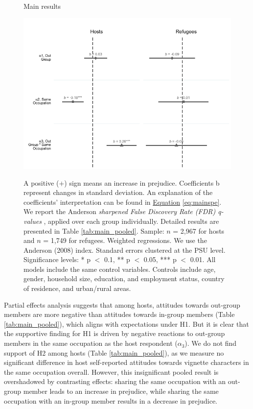 \documentclass[a4paper,12pt]{article}
\renewcommand{\footnotesize}{\fontsize{8pt}{9pt}\selectfont}
\begin{document}
    \begin{figure}[h]
        \footnotesize
        \captionsetup{width=0.7\linewidth}
        \caption{Main results}
        \label{fig:mainpooled}
         \centering
        \includegraphics[height=0.4\textwidth]{Figures/FIG4_CFP_Analysis.pdf} \\
        \caption*{
        \footnotesize A positive ($+$) sign means an increase in prejudice. Coefficients b represent changes in standard deviation. An explanation of the coefficients' interpretation can be found in \hyperref[eq:mainspe]{Equation} \ref{eq:mainspe}. We report the Anderson \textit{sharpened False Discovery Rate (FDR) q-values} \cite{anderson2008multiple}, applied over each group individually. Detailed results are presented in Table \ref{tab:main_pooled}. Sample: $n$ = 2,967 for hosts and $n$ = 1,749 for refugees. Weighted regressions. We use the Anderson (2008) index. Standard errors clustered at the PSU level. Significance levels: * p $<$ 0.1, ** p $<$ 0.05, *** p $<$ 0.01. All models include the same control variables. Controls include age, gender, household size, education, and employment status, country of residence, and urban/rural areas.}
        
    \vspace{5mm}
    \end{figure} 

    Partial effects analysis suggests that among hosts, attitudes towards out-group members are more negative than attitudes towards in-group members (Table \ref{tab:main_pooled}), which aligns with expectations under H1. But it is clear that the supportive finding for H1 is driven by negative reactions to out-group members in the same occupation as the host respondent ($\alpha_{3}$). We do not find support of H2 among hosts (Table \ref{tab:main_pooled}), as we measure no significant difference in host self-reported attitudes towards vignette characters in the same occupation overall. However, this insignificant pooled result is overshadowed by contrasting effects: sharing the same occupation with an out-group member leads to an increase in prejudice, while sharing the same occupation with an in-group member results in a decrease in prejudice.
    
\end{document}
